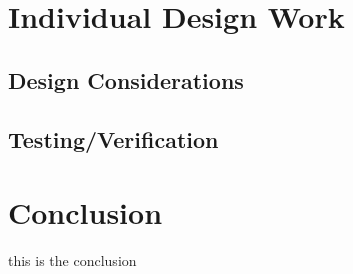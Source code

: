 \documentclass[12pt]{article}
\begin{document}
\section{Individual Design Work}
\subsection{Design Considerations}
\subsection{Testing/Verification}
\section{Conclusion}
this is the conclusion 
\newpage

\end{document}
